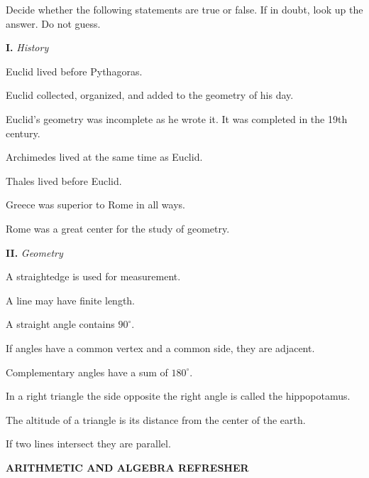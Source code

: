 \documentclass[11pt]{book}
\begin{document}
Decide whether the following statements are true or false. If in doubt, look up
the answer. Do not guess.

\medskip
\noindent\textbf{I.} \emph{History}
\begin{exlist}
\item Euclid lived before Pythagoras.
\item Euclid collected, organized, and added to the geometry of his day.
\item Euclid's geometry was incomplete as he wrote it. It was completed in the
      19th century.
\item Archimedes lived at the same time as Euclid.
\item Thales lived before Euclid.
\item Greece was superior to Rome in all ways.
\item Rome was a great center for the study of geometry.
\end{exlist}

\medskip
\noindent\textbf{II.} \emph{Geometry}
\begin{exlist}
\item A straightedge is used for measurement.
\item A line may have finite length.
\item A straight angle contains $90^\circ$.
\item If angles have a common vertex and a common side, they are adjacent.
\item Complementary angles have a sum of $180^\circ$.
\item In a right triangle the side opposite the right angle is called the
      hippopotamus.
\item The altitude of a triangle is its distance from the center of the earth.
\item If two lines intersect they are parallel.
\end{exlist}

\begin{center}\bfseries ARITHMETIC AND ALGEBRA REFRESHER\end{center}
\nopagebreak
\end{document}
